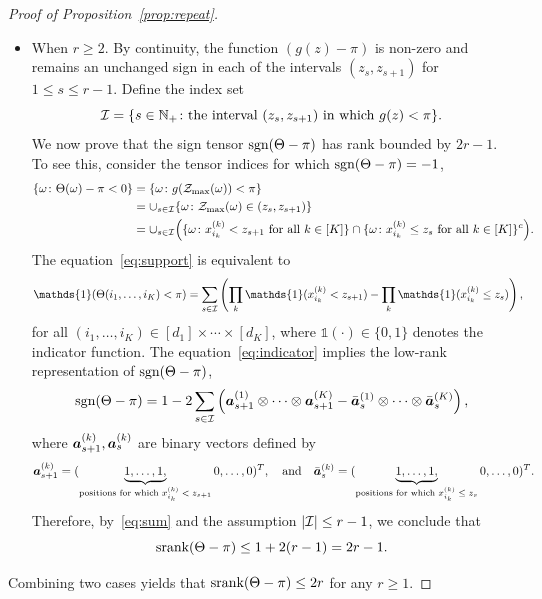 \documentclass[11pt]{article}
\theoremstyle{plain}
\theoremstyle{definition}
\newcommand*{\KeepStyleUnderBrace}[1]{%
  \mathop{%
    \mathchoice
    {\underbrace{\displaystyle#1}}%
    {\underbrace{\textstyle#1}}%
    {\underbrace{\scriptstyle#1}}%
    {\underbrace{\scriptscriptstyle#1}}%
  }\limits
}
\def\sign{\textup{sgn}}
\def\srank{\textup{srank}}
\begin{document}
\begin{proof}[Proof of Proposition~\ref{prop:repeat}]
\begin{itemize}[leftmargin=*,topsep=0pt,itemsep=-1ex,partopsep=1ex,parsep=1ex]
\item When $r\geq 2$.   By continuity, the function $(g(z)-\pi)$ is non-zero and remains an unchanged sign in each of the intervals $(z_s, z_{s+1})$ for $1\leq s\leq r-1$. Define the index set 
\[
\mathcal{I}=\{s\in\mathbb{N}_{+}\colon \text{the interval $(z_s, z_{s+1})$ in which $g(z)<\pi$}\}.
\] 
We now prove that the sign tensor $\sign(\Theta-\pi)$ has rank bounded by $2r-1$. To see this, consider the tensor indices for which $\sign(\Theta-\pi)=-1$,
\begin{align}\label{eq:support}
\{\omega\colon \Theta(\omega)-\pi <0 \} & = \{\omega \colon g(\mathcal{Z}_{\max}(\omega))<\pi\} \notag \\
&=\cup_{s\in \mathcal{I}} \{\omega\colon \mathcal{Z}_{\max}(\omega)\in(z_s,z_{s+1})\}\notag\\
&=\cup_{s\in \mathcal{I}}\Big( \{\omega\colon \text{$x^{(k)}_{i_k}< z_{s+1}$ for all $k\in[K]$}\}\cap \{\omega\colon \text{$x^{(k)}_{i_k}\leq z_{s}$ for all $k\in[K]$}\}^c\Big).
\end{align}
The equation~\eqref{eq:support} is equivalent to 
\begin{align}\label{eq:indicator}
\mathds{1}(\Theta(i_1,\ldots,i_K)< \pi)&
=\sum_{s\in \tI}\left( \prod_k \mathds{1}(x^{(k)}_{i_k}< z_{s+1}) - \prod_k \mathds{1}(x^{(k)}_{i_k}\leq z_{s})\right),
\end{align}
for all $(i_1,\ldots,i_K)\in[d_1]\times \cdots\times[d_K]$, where $\mathds{1}(\cdot)\in\{0,1\}$ denotes the indicator function. The equation~\eqref{eq:indicator} implies the low-rank representation of $\sign(\Theta-\pi)$,
\begin{equation}\label{eq:sum}
\sign(\Theta-\pi)=1-2\sum_{s\in \tI } \left(\ma^{(1)}_{s+1}\otimes\cdots\otimes \ma^{(K)}_{s+1} - \bar \ma^{(1)}_s\otimes\cdots\otimes \bar \ma^{(K)}_s\right),
\end{equation}
where $\bm{a}^{(k)}_{s+1}, \bm{a}^{(k)}_{s}$ are binary vectors defined by
\[
\ma^{(k)}_{s+1}=(\KeepStyleUnderBrace{1,\ldots,1,}_{\text{positions for which $x_{i_k}^{(k)}<z_{s+1}$}}0,\ldots, 0)^T,\quad \text{and}\quad
\bar \ma^{(k)}_s=(\KeepStyleUnderBrace{1,\ldots,1,}_{\text{positions for which $x_{i_k}^{(k)}\leq z_{s}$}}0,\ldots, 0)^T.
\]
Therefore, by~\eqref{eq:sum} and the assumption $|\mathcal{I}|\leq r-1$, we conclude that 
\[
\srank(\Theta-\pi)\leq 1+2(r-1)=2r-1.
\]
\end{itemize}
Combining two cases yields that $\srank(\Theta-\pi)\leq 2r$ for any $r\geq 1$.
\end{proof}
\end{document}
